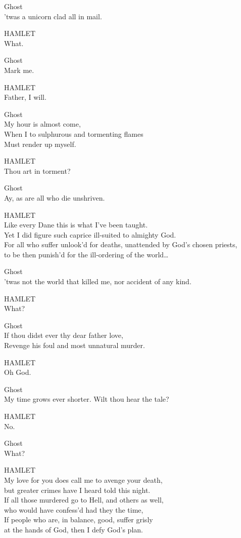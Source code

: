 Ghost\\
'twas a unicorn clad all in mail.

HAMLET\\
What.

Ghost\\
Mark me.

HAMLET\\
Father, I will.

Ghost\\
My hour is almost come,\\
When I to sulphurous and tormenting flames\\
Must render up myself.

HAMLET\\
Thou art in torment?

Ghost\\
Ay, as are all who die unshriven.

HAMLET\\
Like every Dane this is what I've been taught.\\
Yet I did figure such caprice ill-suited to almighty God.\\
For all who suffer unlook'd for deaths, unattended by God's chosen priests,\\
to be then punish'd for the ill-ordering of the world{\ldots}

Ghost\\
'twas not the world that killed me, nor accident of any kind.

HAMLET\\
What?

Ghost\\
If thou didst ever thy dear father love,\\
Revenge his foul and most unnatural murder.

HAMLET\\
Oh God.

Ghost\\
My time grows ever shorter. Wilt thou hear the tale?

HAMLET\\
No.

Ghost\\
What?

HAMLET\\
My love for you does call me to avenge your death,\\
but greater crimes have I heard told this night.\\
If all those murdered go to Hell, and others as well,\\
who would have confess'd had they the time,\\
If people who are, in balance, good, suffer grisly\\
at the hands of God, then I defy God's plan.

